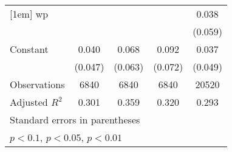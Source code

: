{\begin{tabular}{l*{4}{c}}
[1em]
wp                  &                     &                     &                     &       0.038         \\
                    &                     &                     &                     &     (0.059)         \\
[1em]
Constant            &       0.040         &       0.068         &       0.092         &       0.037         \\
                    &     (0.047)         &     (0.063)         &     (0.072)         &     (0.049)         \\
\hline
Observations        &        6840         &        6840         &        6840         &       20520         \\
Adjusted \(R^{2}\)  &       0.301         &       0.359         &       0.320         &       0.293         \\
\hline\hline
\multicolumn{5}{l}{\footnotesize Standard errors in parentheses}\\
\multicolumn{5}{l}{\footnotesize \sym{*} \(p<0.1\), \sym{**} \(p<0.05\), \sym{***} \(p<0.01\)}\\
\end{tabular}
}
